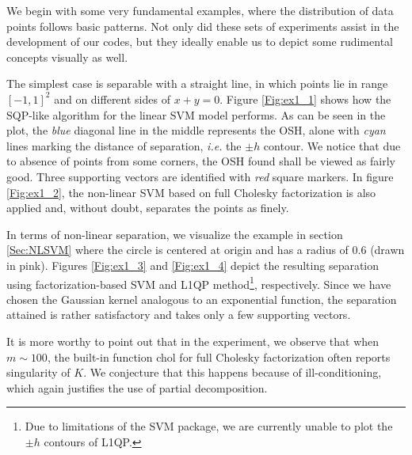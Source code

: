 \documentclass[11pt,a4paper]{article}
\theoremstyle{definition}
\begin{document}
      We begin with some very fundamental examples, where the distribution of data points follows basic patterns. Not only did these sets of experiments assist in the development of our codes, but they ideally enable us to depict some rudimental concepts visually as well.

      The simplest case is separable with a straight line, in which points lie in range $\left[-1,1\right]^{2}$ and on different sides of $x+y=0$. Figure \ref{Fig:ex1_1} shows how the SQP-like algorithm for the linear SVM model performs. As can be seen in the plot, the \textit{blue} diagonal line in the middle represents the OSH, alone with \textit{cyan} lines marking the distance of separation, \textit{i.e.} the $\pm h$ contour. We notice that due to absence of points from some corners, the OSH found shall be viewed as fairly good. Three supporting vectors are identified with \textit{red} square markers. In figure \ref{Fig:ex1_2}, the non-linear SVM based on full Cholesky factorization is also applied and, without doubt, separates the points as finely.

      In terms of non-linear separation, we visualize the example in section \ref{Sec:NLSVM} where the circle is centered at origin and has a radius of $0.6$ (drawn in pink). Figures \ref{Fig:ex1_3} and \ref{Fig:ex1_4} depict the resulting separation using factorization-based SVM and L1QP method\footnote{Due to limitations of the SVM package, we are currently unable to plot the $\pm h$ contours of L1QP.}, respectively. Since we have chosen the Gaussian kernel analogous to an exponential function, the separation attained is rather satisfactory and takes only a few supporting vectors.

      It is more worthy to point out that in the experiment, we observe that when $m\sim 100$, the built-in function \textsf{chol} for full Cholesky factorization often reports singularity of $K$. We conjecture that this happens because of ill-conditioning, which again justifies the use of partial decomposition.
\end{document}
